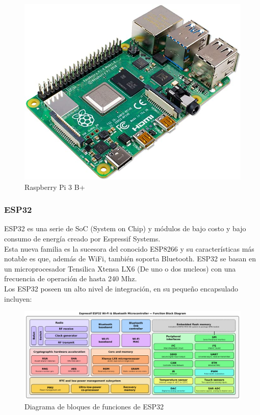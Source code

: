 \documentclass[12pt,titlepage]{article}
\begin{document}
\begin{figure}[htbp]
\hspace*{3.8cm} 
\includegraphics[scale=0.42]{Rpi}
\caption{Raspberry Pi 3 B+}
\end{figure}

\newpage
\subsubsection{ESP32}
ESP32 es una serie de SoC (System on Chip) y módulos de bajo costo y bajo consumo de energía creado por Espressif Systems. \\

Esta nueva familia es la sucesora del conocido ESP8266 y su características más notable es que, además de WiFi, también soporta Bluetooth.
ESP32 se basan en un microprocesador Tensilica Xtensa LX6 (De uno o dos nucleos) con una frecuencia de operación de hasta 240 Mhz. \\

Los ESP32 poseen un alto nivel de integración, en su pequeño encapsulado incluyen: 

\begin{figure}[htbp]
\hspace*{0.5cm} 
\includegraphics[scale=0.38]{especi_32}
\caption{Diagrama de bloques de funciones de ESP32}
\end{figure}
\end{document}
